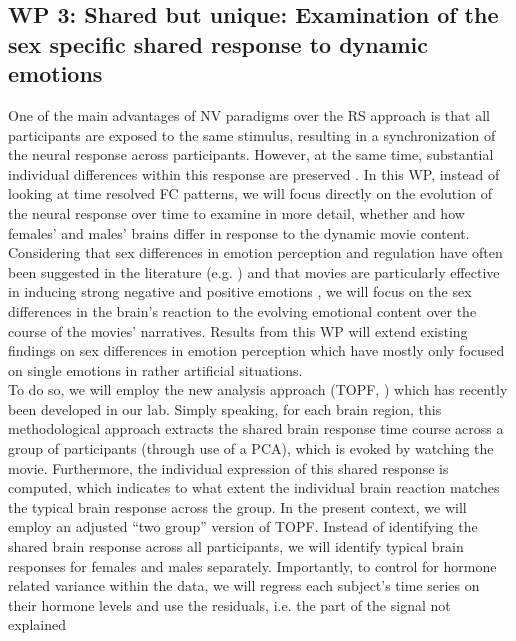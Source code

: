 \documentclass[11pt,a4paper]{article}
\begin{document}
\subsection*{WP 3: Shared but unique: Examination of the sex specific shared response to dynamic emotions}
One of the main advantages of NV paradigms over the RS approach is that all participants are exposed to
the same stimulus, resulting in a synchronization of the neural response across participants. However, at
the same time, substantial individual differences within this 
response are preserved \parencite{finnIdiosynchronySharedResponses2020a,vanderwalIndividualDifferencesFunctional2017}. 
In this WP, instead of looking at time resolved FC patterns, we will focus directly
on the evolution of the neural response over time to examine in more detail, whether and how females' and
males' brains differ in response to the dynamic movie content. Considering that sex differences in emotion
perception and regulation have often been suggested in the literature 
(e.g. \parencite{domesNeuralCorrelatesSex2010a,gardenerSexDifferencesEmotion2013a})
and that movies are particularly effective in inducing strong negative and positive emotions
\parencite{grossEmotionElicitationUsing1995,westermannRelativeEffectivenessValidity1996}, we will 
focus on the sex differences in the brain's reaction
to the evolving emotional content over the course of the movies' narratives. Results from this WP will
extend existing findings on sex differences in emotion perception which have mostly only focused on single
emotions in rather artificial situations.\\
To do so, we will employ the new analysis approach (TOPF, \parencite{liTopographybasedPredictiveFramework2023a}) 
which has recently been developed in our lab. Simply speaking, for each brain region, this
methodological approach extracts the
shared brain response time course across a group of participants (through use of a PCA), which is evoked
by watching the movie. Furthermore, the individual expression of this shared response is computed, which
indicates to what extent the individual brain reaction matches the typical brain response across the group.
In the present context, we will employ an adjusted “two group” version of TOPF. Instead of identifying the
shared brain response across all participants, we will identify typical brain responses for females and males
separately. Importantly, to control for hormone related variance within the data, we will regress each
subject's time series on their hormone levels and use the residuals, i.e. the part of the signal not explained
\end{document}
